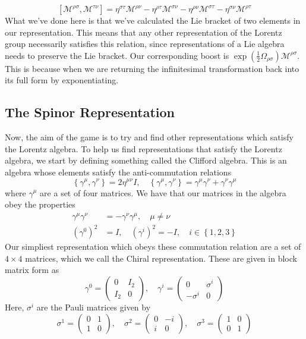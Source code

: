 \[
	[ \mathcal{ M } ^{ \rho \sigma } , \mathcal{ M  } ^{ \tau \nu  } ] 
	= \eta ^{ \sigma \tau } \mathcal{ M } ^{ \rho \nu } - \eta ^{ \rho \tau } \mathcal{ M} ^{ \sigma \nu }
	- \eta ^{ \rho \nu } \mathcal{ M }^{ \sigma \tau } - \eta ^{ \sigma \nu } \mathcal{ M } ^{ \rho \tau }
\] What we've 
done here is that we've calculated the Lie bracket of two 
elements in our representation. This means that any other representation 
of the Lorentz group necessarily satisfies this relation, since 
representations of a Lie algebra needs to preserve the Lie bracket. 
Our corresponding boost is $ \exp ( \frac{1}{2 } \Omega_{ \rho \sigma  } ) \mathcal{ M } ^{ \rho \sigma }$.
This is because when we are returning 
the infinitesimal transformation back into its full form 
by exponentiating. 

\subsection{The Spinor Representation} 

Now, the aim of the game is to try and find 
other representations which satisfy the 
Lorentz algebra.
To help us find representations that satisfy the 
Lorentz algebra, we start by defining 
something called the Clifford algebra. This is an algebra whose 
elements satisfy the anti-commutation 
relations 
\[
 \left\{  \gamma ^ \mu , \gamma ^ \nu  \right\}  = 2 \eta ^{ \mu \nu } I , 
 \quad \left\{  \gamma ^ \mu , \gamma ^  \nu  \right\}   = \gamma ^ \mu \gamma ^ \nu 
 + \gamma ^ \nu \gamma ^ \mu 
\] where $ \gamma ^ \mu $ are a set of four matrices. 
We have that our matrices in the algebra obey 
the properties 
\begin{align*}
	\gamma ^ \mu \gamma ^ \nu & = - \gamma ^ \nu \gamma ^ \mu , \quad \mu \neq \nu \\
	( \gamma ^ 0 ) ^ 2 & = I, \quad ( \gamma ^ i ) ^ 2 =  - I , \quad i \in \left\{ 1, 2, 3  \right\} 
\end{align*}
Our simpliest representation which obeys these commutation relation 
are a set of $ 4 \times 4 $ matrices, which we call the Chiral representation. 
These are given in block matrix form as 
\[
	\gamma ^ 0 = \begin{pmatrix}  0 & I _ 2 \\ I _ 2 & 0  \end{pmatrix} , \quad 
	\gamma ^ i = \begin{pmatrix}  0 & \sigma ^ i \\ - \sigma ^ i & 0  \end{pmatrix} 
\] Here, $ \sigma ^ i  $  are the 
Pauli matrices given by 
\[
	\sigma ^ 1 = \begin{pmatrix}  0 & 1 \\ 1 & 0  \end{pmatrix}  , \quad 
	\sigma ^ 2 = \begin{pmatrix}  0 & - i \\ i & 0  \end{pmatrix} , \quad
	\sigma ^ 3  = \begin{pmatrix}  1 &  0 \\ 0 & 1  \end{pmatrix} 
\] 

